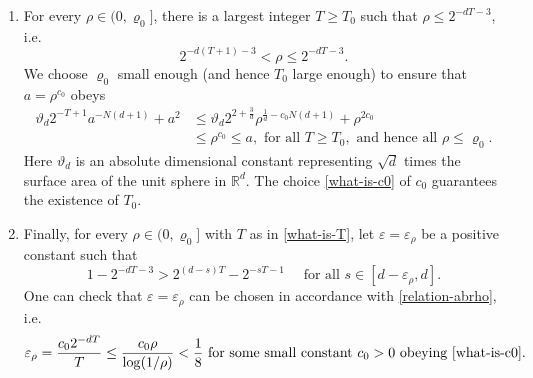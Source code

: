 \documentclass[a4paper,11pt]{amsart}
\numberwithin{equation}{section}
\begin{document}
\begin{enumerate}[1.]
\vskip0.1in
\begin{itemize} 
\item $a = \rho^{c_0}$ obeys \eqref{tail-phi} with $a = R^{-1}$; 
\vskip0.1in 
\item $b = a^{\kappa}$ obeys the conditions specified in \eqref{abdN}. 
\end{itemize}
\vskip0.1in   
\item  For every $\rho \in (0, \varrho_0]$, there is a largest integer $T \geq T_0$ such that  $\rho \leq 2^{-dT-3}$, i.e. 
\begin{equation} \label{what-is-T}
2^{-d(T+1)-3} < \rho \leq 2^{-dT-3}. 
\end{equation}  
We choose $\varrho_0$ small enough (and hence $T_0$ large enough) to ensure that $a = \rho^{c_0}$ obeys 
\begin{align} 
\vartheta_d 2^{-T+1} a^{-N(d+1)} + a^2 &\leq \vartheta_d 2^{2 + \frac{3}{d}} \rho^{\frac{1}{d} - c_0 N(d+1)} + \rho^{2c_0} \nonumber \\ &\leq \rho^{c_0} \leq a, \text{ for all } T \geq T_0, \text{ and hence all } \rho \leq \varrho_0.  \label{T-large} 
\end{align}  
Here $\vartheta_d$ is an absolute dimensional constant representing $\sqrt{d}$ times the surface area of the unit sphere in $\mathbb R^d$. The choice \eqref{what-is-c0} of $c_0$ guarantees the existence of $T_0$.  
\vskip0.1in
\item Finally, for every $\rho \in (0, \varrho_0]$ with $T$ as in \eqref{what-is-T}, let $\varepsilon = \varepsilon_{\rho}$ be a positive constant such that 
\begin{equation}  \label{what-is-epsilon}
1 - 2^{-dT-3} > 2^{(d-s)T} - 2^{-sT-1} \quad \text{ for all } s \in [d-\varepsilon_{\rho}, d]. 
\end{equation}   
One can check that $\varepsilon = \varepsilon_{\rho}$ can be chosen in accordance with \eqref{relation-abrho}, i.e. 
\[ \varepsilon_{\rho} = \frac{c_0 2^{-dT}}{T} \leq \frac{c_0 \rho}{\log(1/\rho)} < \frac{1}{8} \text{ for some small constant $c_0 > 0$ obeying \eqref{what-is-c0}.} \] 
\end{enumerate} 
\end{document}
